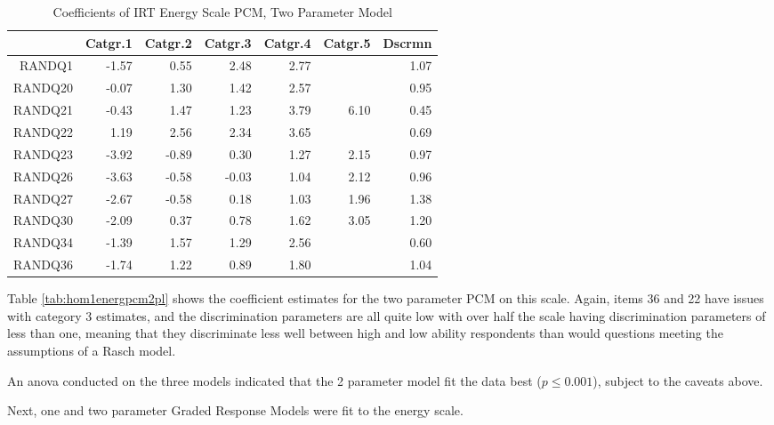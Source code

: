 \documentclass{article}
\begin{document}
\begin{table}[ht]
\centering
\begin{tabular}{rrrrrrr}
  \hline
 & Catgr.1 & Catgr.2 & Catgr.3 & Catgr.4 & Catgr.5 & Dscrmn \\ 
  \hline
RANDQ1 & -1.57 & 0.55 & 2.48 & 2.77 &  & 1.07 \\ 
  RANDQ20 & -0.07 & 1.30 & 1.42 & 2.57 &  & 0.95 \\ 
  RANDQ21 & -0.43 & 1.47 & 1.23 & 3.79 & 6.10 & 0.45 \\ 
  RANDQ22 & 1.19 & 2.56 & 2.34 & 3.65 &  & 0.69 \\ 
  RANDQ23 & -3.92 & -0.89 & 0.30 & 1.27 & 2.15 & 0.97 \\ 
  RANDQ26 & -3.63 & -0.58 & -0.03 & 1.04 & 2.12 & 0.96 \\ 
  RANDQ27 & -2.67 & -0.58 & 0.18 & 1.03 & 1.96 & 1.38 \\ 
  RANDQ30 & -2.09 & 0.37 & 0.78 & 1.62 & 3.05 & 1.20 \\ 
  RANDQ34 & -1.39 & 1.57 & 1.29 & 2.56 &  & 0.60 \\ 
  RANDQ36 & -1.74 & 1.22 & 0.89 & 1.80 &  & 1.04 \\ 
   \hline
\end{tabular}
\caption{Coefficients of IRT Energy Scale PCM, Two Parameter Model} 
\label{tab:hom1energypcm2pl}
\end{table}

Table \ref{tab:hom1energpcm2pl} shows the coefficient estimates for the two parameter PCM on this scale. Again, items 36 and 22 have issues with category 3 estimates, and the discrimination parameters are all quite low with over half the scale having discrimination parameters of less than one, meaning that they discriminate less well between high and low ability respondents than would questions meeting the assumptions of a Rasch model. 


An anova conducted on the three models indicated that the 2 parameter model fit the data best ($p \le 0.001$), subject to the caveats above.


Next, one and two parameter Graded Response Models were fit to the energy scale. 
\end{document}
